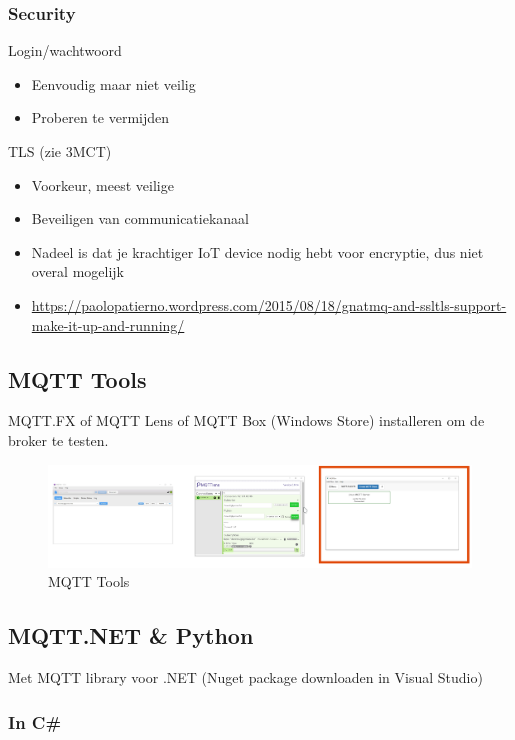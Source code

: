 \documentclass{article}
\begin{document}
\subsubsection{Security}

Login/wachtwoord

\begin{itemize}
    \item Eenvoudig maar niet veilig
    \item Proberen te vermijden
\end{itemize}

TLS (zie 3MCT)
\begin{itemize}
    \item Voorkeur, meest veilige
    \item Beveiligen van communicatiekanaal
    \item Nadeel is dat je krachtiger IoT device nodig hebt voor encryptie, dus niet overal mogelijk
    \item \url{https://paolopatierno.wordpress.com/2015/08/18/gnatmq-and-ssltls-support-make-it-up-and-running/}
\end{itemize}

\subsection{MQTT Tools}

MQTT.FX of MQTT Lens of MQTT Box (Windows Store) installeren om de broker te testen.

\begin{figure}[H]
    \centering
    \includegraphics[width=\textwidth]{mqtt-tools.png}
    \caption{MQTT Tools}
\end{figure}

\subsection{MQTT.NET \& Python}

Met MQTT library voor .NET (Nuget package downloaden in Visual Studio)

\subsubsection{In C\#}
\end{document}
